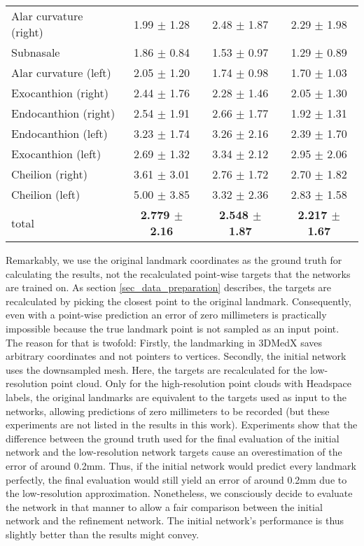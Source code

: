 \documentclass[class=article, crop=false]{standalone}
\begin{document}
\begin{table*}[!htbp]
\begin{tabularx}{\textwidth}{l|c|c|c}
Alar curvature (right) & 1.99 $\pm$ 1.28 & 2.48 $\pm$ 1.87 & 2.29 $\pm$ 1.98\\
Subnasale              & 1.86 $\pm$ 0.84 & 1.53 $\pm$ 0.97 & 1.29 $\pm$ 0.89\\
Alar curvature (left)  & 2.05 $\pm$ 1.20 & 1.74 $\pm$ 0.98 & 1.70 $\pm$ 1.03\\   
Exocanthion (right)    & 2.44 $\pm$ 1.76 & 2.28 $\pm$ 1.46 & 2.05 $\pm$ 1.30\\ 
Endocanthion (right)   & 2.54 $\pm$ 1.91 & 2.66 $\pm$ 1.77 & 1.92 $\pm$ 1.31\\ 
Endocanthion (left)    & 3.23 $\pm$ 1.74 & 3.26 $\pm$ 2.16 & 2.39 $\pm$ 1.70\\
Exocanthion (left)     & 2.69 $\pm$ 1.32 & 3.34 $\pm$ 2.12 & 2.95 $\pm$ 2.06\\
Cheilion (right)       & 3.61 $\pm$ 3.01 & 2.76 $\pm$ 1.72 & 2.70 $\pm$ 1.82\\
Cheilion (left)        & 5.00 $\pm$ 3.85 & 3.32 $\pm$ 2.36 & 2.83 $\pm$ 1.58\\

\bottomrule
total & \textbf{2.779 $\pm$ 2.16} & \textbf{2.548 $\pm$ 1.87} & \textbf{2.217 $\pm$ 1.67}
\end{tabularx}
\end{table*}


Remarkably, we use the original landmark coordinates as the ground truth for calculating the results, not the recalculated point-wise targets that the networks are trained on. As section \ref{sec_data_preparation} describes, the targets are recalculated by picking the closest point to the original landmark. Consequently, even with a point-wise prediction an error of zero millimeters is practically impossible because the true landmark point is not sampled as an input point. The reason for that is twofold: Firstly, the landmarking in 3DMedX saves arbitrary coordinates and not pointers to vertices. Secondly, the initial network uses the downsampled mesh. Here, the targets are recalculated for the low-resolution point cloud. Only for the high-resolution point clouds with Headspace labels, the original landmarks are equivalent to the targets used as input to the networks, allowing predictions of zero millimeters to be recorded (but these experiments are not listed in the results in this work). Experiments show that the difference between the ground truth used for the final evaluation of the initial network and the low-resolution network targets cause an overestimation of the error of around 0.2mm. Thus, if the initial network would predict every landmark perfectly, the final evaluation would still yield an error of around 0.2mm due to the low-resolution approximation. Nonetheless, we consciously decide to evaluate the network in that manner to allow a fair comparison between the initial network and the refinement network. The initial network's performance is thus slightly better than the results might convey.
\end{document}
